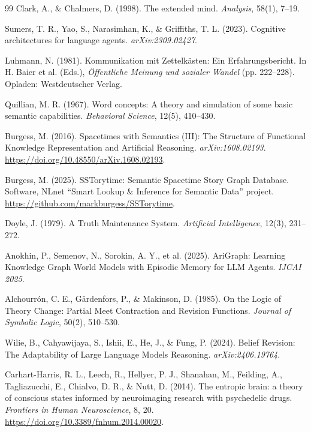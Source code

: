\begin{thebibliography}{99}
Clark, A., \& Chalmers, D. (1998).
The extended mind.
\textit{Analysis}, 58(1), 7--19.

Sumers, T. R., Yao, S., Narasimhan, K., \& Griffiths, T. L. (2023).
Cognitive architectures for language agents.
\textit{arXiv:2309.02427}.

Luhmann, N. (1981).
Kommunikation mit Zettelk\"asten: Ein Erfahrungsbericht.
In H. Baier et al. (Eds.), \textit{\"Offentliche Meinung und sozialer Wandel} (pp. 222--228). Opladen: Westdeutscher Verlag.

Quillian, M. R. (1967).
Word concepts: A theory and simulation of some basic semantic capabilities.
\textit{Behavioral Science}, 12(5), 410--430.

Burgess, M. (2016).
Spacetimes with Semantics (III): The Structure of Functional Knowledge Representation and Artificial Reasoning.
\textit{arXiv:1608.02193}. \url{https://doi.org/10.48550/arXiv.1608.02193}.

Burgess, M. (2025).
SSTorytime: Semantic Spacetime Story Graph Database.
Software, NLnet ``Smart Lookup \& Inference for Semantic Data'' project.
\url{https://github.com/markburgess/SSTorytime}.

Doyle, J. (1979).
A Truth Maintenance System.
\textit{Artificial Intelligence}, 12(3), 231--272.

Anokhin, P., Semenov, N., Sorokin, A. Y., et al. (2025).
AriGraph: Learning Knowledge Graph World Models with Episodic Memory for LLM Agents.
\textit{IJCAI 2025}.

Alchourr\'on, C. E., G\"ardenfors, P., \& Makinson, D. (1985).
On the Logic of Theory Change: Partial Meet Contraction and Revision Functions.
\textit{Journal of Symbolic Logic}, 50(2), 510--530.

Wilie, B., Cahyawijaya, S., Ishii, E., He, J., \& Fung, P. (2024).
Belief Revision: The Adaptability of Large Language Models Reasoning.
\textit{arXiv:2406.19764}.

Carhart-Harris, R. L., Leech, R., Hellyer, P. J., Shanahan, M., Feilding, A., Tagliazucchi, E., Chialvo, D. R., \& Nutt, D. (2014).
The entropic brain: a theory of conscious states informed by neuroimaging research with psychedelic drugs.
\textit{Frontiers in Human Neuroscience}, 8, 20.
\url{https://doi.org/10.3389/fnhum.2014.00020}.


\end{thebibliography}
